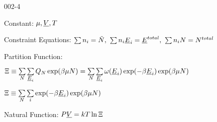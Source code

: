 \begin{mitframe}{002-4}

    
\begin{listone}
    
    \item Constant: $\chempot, \uline{\vol}, \Temp$

    \item Constraint Equations: $\sum\nolimits \molspecies{i} = \totmoles, ~\sum\nolimits \molspecies{i}\uline{\energy}_{i} = \uline{\energy}^{total},~\sum\nolimits \molspecies{i}\nummoles = \nummoles^{total}  $     %
    
    \item Partition Function:
    
    \begin{listtwo}
        
    	\item $\gcpf \equiv \sum\limits_{\nummoles}\sum\limits_{\uline{\energy}_{i}} \cpf\exp(\boltznorm\chempot\nummoles) = \sum\limits_{\nummoles}\sum\limits_{\uline{\energy}_{i}} \mpf(\uline{\energy}_{i})\exp(-\boltznorm\uline{\energy}_{i})\exp(\boltznorm\chempot\nummoles) $
    
    	\item $\gcpf \equiv \sum\limits_{\nummoles}\sum\limits_{i} \exp(-\boltznorm\uline{\energy}_{i})\exp(\boltznorm\chempot\nummoles) $
    
    \end{listtwo}
    
    \medskip       
    
    \item Natural Function: $\p\uline{\vol} = \thermcond\Temp\ln\gcpf$
    
\end{listone}
    
\end{mitframe}